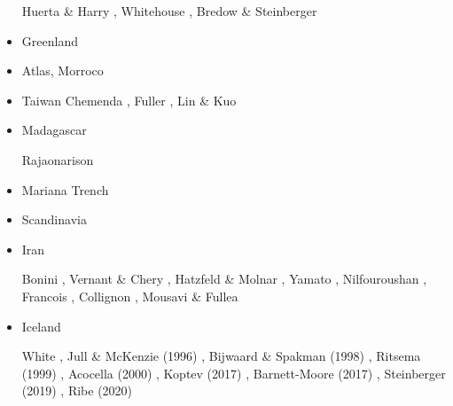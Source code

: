 \begin{itemize}
\begin{scriptsize}
Huerta \& Harry \cite{huha07},
Whitehouse \etal \cite{whbl12},
Bredow \& Steinberger \cite{brst21}
\end{scriptsize}

\item Greenland  
{\scriptsize
\cite{stsj15}\cite{heps15}\cite{stbl19}
}
\item Atlas, Morroco  
{\scriptsize
\cite{mica12}
\cite{kava14}
}
\item Taiwan  
{\scriptsize
Chemenda \etal \cite{chys01}, Fuller \etal \cite{fuwf06}, Lin \& Kuo \cite{liku16}
}
\item Madagascar 
\begin{scriptsize}
\twothousandtwenty Rajaonarison \etal \cite{rasf20} 
\end{scriptsize}

\item Mariana Trench  
{\scriptsize
\cite{zhlb15}
}
\item Scandinavia  
{\scriptsize
\cite{ramb80}
\cite{bovc14}
}
\item Iran

\begin{scriptsize}
Bonini \etal \cite{bocs03},
Vernant \&  Chery \cite{vech06},
Hatzfeld \& Molnar \cite{hamo10},
Yamato \etal \cite{yakm11},
Nilfouroushan \etal \cite{nipc13},
Francois \etal \cite{frba14},
Collignon \etal \cite{coyc16},
Mousavi \& Fullea \cite{mofu20}
\end{scriptsize} 
 

\item Iceland

\begin{scriptsize}
White \cite{whit89},
Jull \& McKenzie (1996) \cite{jumc96},
Bijwaard \& Spakman  (1998) \cite{bisp98},
Ritsema \etal (1999) \cite{rivw99},
Acocella \etal  (2000) \cite{acgf00},
Koptev \etal (2017) \cite{kocb17},
Barnett-Moore \etal (2017) \cite{bahf17},
Steinberger \etal (2019) \cite{stbl19},
Ribe \etal (2020) \cite{rits20}
\end{scriptsize} 


\end{itemize}
